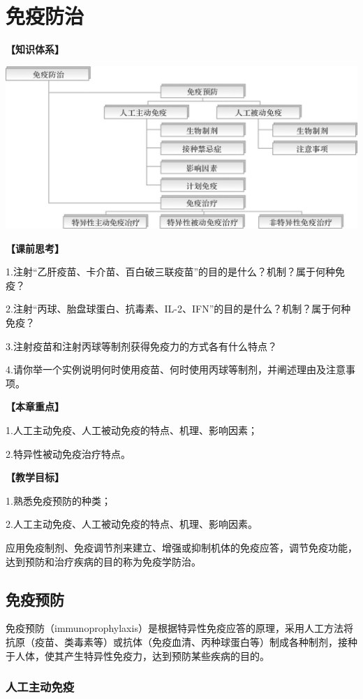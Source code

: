 \chapter{免疫防治}
\begin{framed}
\noindent\textbf{【知识体系】}
\begin{center}
\includegraphics[width=.7\textwidth]{./images/Image00184.jpg}
\end{center}
\noindent\textbf{【课前思考】}

1.注射“乙肝疫苗、卡介苗、百白破三联疫苗”的目的是什么？机制？属于何种免疫？

2.注射“丙球、胎盘球蛋白、抗毒素、IL-2、IFN”的目的是什么？机制？属于何种免疫？

3.注射疫苗和注射丙球等制剂获得免疫力的方式各有什么特点？

4.请你举一个实例说明何时使用疫苗、何时使用丙球等制剂，并阐述理由及注意事项。

\noindent\textbf{【本章重点】}

1.人工主动免疫、人工被动免疫的特点、机理、影响因素；

2.特异性被动免疫治疗特点。

\noindent\textbf{【教学目标】}

1.熟悉免疫预防的种类；

2.人工主动免疫、人工被动免疫的特点、机理、影响因素。
\end{framed}

应用免疫制剂、免疫调节剂来建立、增强或抑制机体的免疫应答，调节免疫功能，达到预防和治疗疾病的目的称为免疫学防治。

\section{免疫预防}

免疫预防（immunoprophylaxis）是根据特异性免疫应答的原理，采用人工方法将抗原（疫苗、类毒素等）或抗体（免疫血清、丙种球蛋白等）制成各种制剂，接种于人体，使其产生特异性免疫力，达到预防某些疾病的目的。


\subsection{人工主动免疫}

